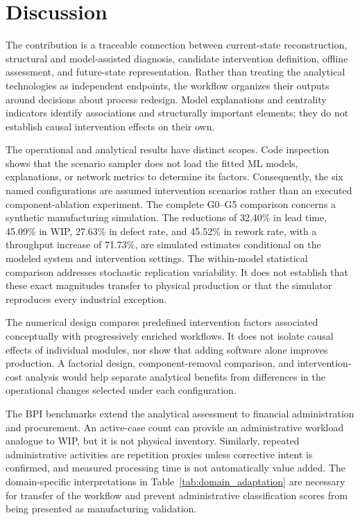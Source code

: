 \section{Discussion}
\label{sec:discussion}

The contribution is a traceable connection between current-state reconstruction, structural and model-assisted diagnosis, candidate intervention definition, offline assessment, and future-state representation. Rather than treating the analytical technologies as independent endpoints, the workflow organizes their outputs around decisions about process redesign. Model explanations and centrality indicators identify associations and structurally important elements; they do not establish causal intervention effects on their own.

The operational and analytical results have distinct scopes. Code inspection shows that the scenario sampler does not load the fitted ML models, explanations, or network metrics to determine its factors. Consequently, the six named configurations are assumed intervention scenarios rather than an executed component-ablation experiment. The complete G0--G5 comparison concerns a synthetic manufacturing simulation. The reductions of 32.40\% in lead time, 45.09\% in WIP, 27.63\% in defect rate, and 45.52\% in rework rate, with a throughput increase of 71.73\%, are simulated estimates conditional on the modeled system and intervention settings. The within-model statistical comparison addresses stochastic replication variability. It does not establish that these exact magnitudes transfer to physical production or that the simulator reproduces every industrial exception.

The numerical design compares predefined intervention factors associated conceptually with progressively enriched workflows. It does not isolate causal effects of individual modules, nor show that adding software alone improves production. A factorial design, component-removal comparison, and intervention-cost analysis would help separate analytical benefits from differences in the operational changes selected under each configuration.

The BPI benchmarks extend the analytical assessment to financial administration and procurement. An active-case count can provide an administrative workload analogue to WIP, but it is not physical inventory. Similarly, repeated administrative activities are repetition proxies unless corrective intent is confirmed, and measured processing time is not automatically value added. The domain-specific interpretations in Table~\ref{tab:domain_adaptation} are necessary for transfer of the workflow and prevent administrative classification scores from being presented as manufacturing validation.

